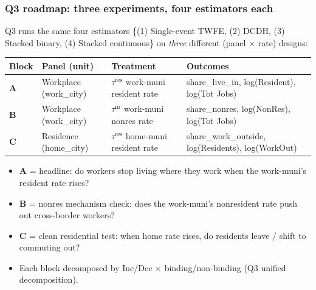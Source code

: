 \documentclass[xcolor = x11names, compress, aspectratio = 169]{beamer}
\renewcommand{\(}{\begin{columns}}
\renewcommand{\)}{\end{columns}}
\newcommand{\<}[1]{\begin{column}{#1}}
\renewcommand{\>}{\end{column}}
\begin{document}
\begin{frame}
\frametitle{Q3 roadmap: three experiments, four estimators each}
    \small
    Q3 runs the same four estimators \{(1) Single-event TWFE, (2) DCDH,
    (3) Stacked binary, (4) Stacked continuous\} on \emph{three}
    different (panel $\times$ rate) designs:
    \medskip
    \scriptsize
    \renewcommand{\arraystretch}{1.25}
    \setlength{\tabcolsep}{6pt}
    \begin{tabular}{llll}
        \toprule
        Block & Panel (unit) & Treatment & Outcomes \\
        \midrule
        \textbf{A} & Workplace (work\_city) & $\tau^{\text{res}}$ work-muni resident rate & share\_live\_in, log(Resident), log(Tot Jobs) \\
        \textbf{B} & Workplace (work\_city) & $\tau^{\text{nr}}$ work-muni nonres rate    & share\_nonres, log(NonRes), log(Tot Jobs) \\
        \textbf{C} & Residence (home\_city) & $\tau^{\text{res}}$ home-muni resident rate & share\_work\_outside, log(Residents), log(WorkOut) \\
        \bottomrule
    \end{tabular}
    \medskip
    \small
    \begin{itemize}\setlength{\itemsep}{0.04cm}\footnotesize
        \item \textbf{A} = headline: do workers stop living where they work
        when the work-muni's resident rate rises?
        \item \textbf{B} = nonres mechanism check: does the work-muni's
        nonresident rate push out cross-border workers?
        \item \textbf{C} = clean residential test: when home rate rises,
        do residents leave / shift to commuting out?
        \item Each block decomposed by Inc/Dec $\times$ binding/non-binding
        (Q3 unified decomposition).
    \end{itemize}
\end{frame}

\end{document}
